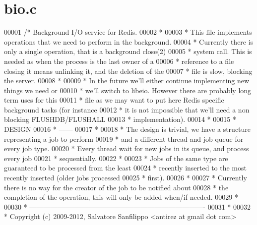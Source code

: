\hypertarget{bio_8c_source}{}\section{bio.\+c}
\label{bio_8c_source}

\begin{DoxyCode}
00001 \textcolor{comment}{/* Background I/O service for Redis.}
00002 \textcolor{comment}{ *}
00003 \textcolor{comment}{ * This file implements operations that we need to perform in the background.}
00004 \textcolor{comment}{ * Currently there is only a single operation, that is a background close(2)}
00005 \textcolor{comment}{ * system call. This is needed as when the process is the last owner of a}
00006 \textcolor{comment}{ * reference to a file closing it means unlinking it, and the deletion of the}
00007 \textcolor{comment}{ * file is slow, blocking the server.}
00008 \textcolor{comment}{ *}
00009 \textcolor{comment}{ * In the future we'll either continue implementing new things we need or}
00010 \textcolor{comment}{ * we'll switch to libeio. However there are probably long term uses for this}
00011 \textcolor{comment}{ * file as we may want to put here Redis specific background tasks (for instance}
00012 \textcolor{comment}{ * it is not impossible that we'll need a non blocking FLUSHDB/FLUSHALL}
00013 \textcolor{comment}{ * implementation).}
00014 \textcolor{comment}{ *}
00015 \textcolor{comment}{ * DESIGN}
00016 \textcolor{comment}{ * ------}
00017 \textcolor{comment}{ *}
00018 \textcolor{comment}{ * The design is trivial, we have a structure representing a job to perform}
00019 \textcolor{comment}{ * and a different thread and job queue for every job type.}
00020 \textcolor{comment}{ * Every thread wait for new jobs in its queue, and process every job}
00021 \textcolor{comment}{ * sequentially.}
00022 \textcolor{comment}{ *}
00023 \textcolor{comment}{ * Jobs of the same type are guaranteed to be processed from the least}
00024 \textcolor{comment}{ * recently inserted to the most recently inserted (older jobs processed}
00025 \textcolor{comment}{ * first).}
00026 \textcolor{comment}{ *}
00027 \textcolor{comment}{ * Currently there is no way for the creator of the job to be notified about}
00028 \textcolor{comment}{ * the completion of the operation, this will only be added when/if needed.}
00029 \textcolor{comment}{ *}
00030 \textcolor{comment}{ * ----------------------------------------------------------------------------}
00031 \textcolor{comment}{ *}
00032 \textcolor{comment}{ * Copyright (c) 2009-2012, Salvatore Sanfilippo <antirez at gmail dot com>}

\end{DoxyCode}
